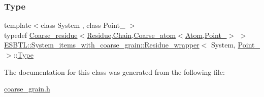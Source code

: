 \subsubsection{\texorpdfstring{Type}{Type}}
{\footnotesize\ttfamily template$<$class System , class Point\+\_ $>$ \\
typedef \hyperlink{classESBTL_1_1Coarse__residue}{Coarse\+\_\+residue}$<$\hyperlink{classESBTL_1_1Molecular__residue}{Residue},\hyperlink{classESBTL_1_1Molecular__chain}{Chain},\hyperlink{classESBTL_1_1Coarse__atom}{Coarse\+\_\+atom}$<$\hyperlink{classESBTL_1_1Molecular__atom}{Atom},\hyperlink{classESBTL_1_1Point__3}{Point\+\_}$>$ $>$ \hyperlink{classESBTL_1_1System__items__with__coarse__grain_1_1Residue__wrapper}{E\+S\+B\+T\+L\+::\+System\+\_\+items\+\_\+with\+\_\+coarse\+\_\+grain\+::\+Residue\+\_\+wrapper}$<$ System, \hyperlink{classESBTL_1_1Point__3}{Point\+\_} $>$\+::\hyperlink{classESBTL_1_1System__items__with__coarse__grain_1_1Residue__wrapper_a8aa82ba7375c40e7d0ec250584bb4c8b}{Type}}



The documentation for this class was generated from the following file\+:\begin{DoxyCompactItemize}
\item 
\hyperlink{coarse__grain_8h}{coarse\+\_\+grain.\+h}\end{DoxyCompactItemize}
